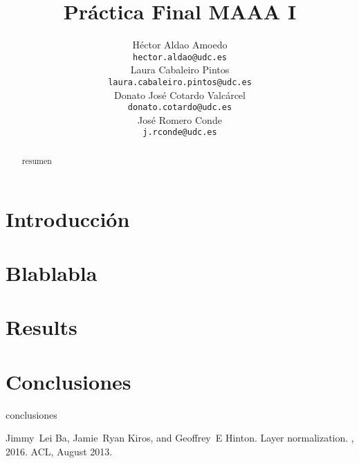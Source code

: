 \documentclass{article}
\title{Práctica Final MAAA I}
\author{
	\AND
	Héctor Aldao Amoedo\\
	\texttt{hector.aldao@udc.es}\\  
	\And
	Laura Cabaleiro Pintos\\
	\texttt{laura.cabaleiro.pintos@udc.es}\\
	\And
	Donato José Cotardo Valcárcel \\
	\texttt{donato.cotardo@udc.es}\\
	\And
	José Romero Conde\\
	\texttt{j.rconde@udc.es}\\
	\And  
}
\begin{document}
	
	
	\maketitle
	
	\begin{abstract}
		
		resumen
		
	\end{abstract}
	
	\section{Introducción}
	
	
	
	\section{Blablabla}
	
	
	\section{Results} 
	
	
	\section{Conclusiones}
	
	conclusiones
	
	
	\begin{thebibliography}{10}
		
		Jimmy~Lei Ba, Jamie~Ryan Kiros, and Geoffrey~E Hinton.
		\newblock Layer normalization.
		, 2016.
		ACL, August 2013.
		
	\end{thebibliography}
	
\end{document}

